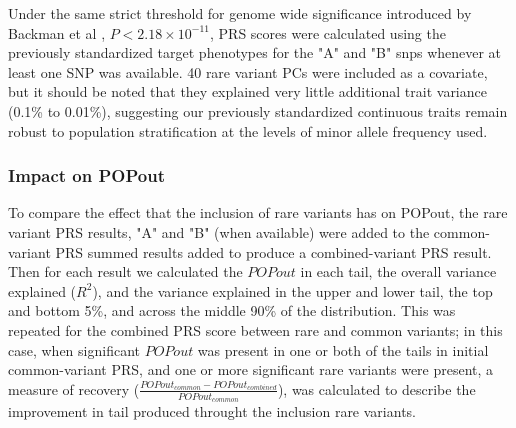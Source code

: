 \documentclass[12pt]{zHenriquesLab-StyleBioRxiv}
\begin{document}
{{{Under the same strict threshold for genome wide significance introduced
by Backman et al \cite{Backman2021}, $P<2.18 \times 10^{-11}$, PRS scores
were calculated using the previously standardized target phenotypes for
the "A" and "B" snps whenever at least one SNP was available.  40 rare variant PCs
were included as a covariate, but it should be noted that they explained very
little additional trait variance (0.1\% to 0.01\%), suggesting our previously
standardized continuous traits remain robust to population stratification
at the levels of minor allele frequency used.

\subsubsection*{Impact on POPout}

To compare the effect that the inclusion of rare variants has on POPout, the rare variant PRS results,
"A" and "B" (when available) were added to the common-variant PRS summed results added to produce a 
combined-variant PRS result.  Then for each result we calculated the $POPout$ 
in each tail, the overall variance explained ($R^2$), and the variance
explained in the upper and lower tail, the top and bottom 5\%, and across the middle 90\% of the
distribution.   This was repeated for the combined PRS score between rare and common variants;
in this case, when significant $POPout$ was present in one or both of the tails in initial
common-variant PRS, and one or more significant rare variants were present, 
a measure of recovery ($\frac{{POPout}_{common}-POPout_{combined}}{POPout_{common}}$),
was calculated to describe the improvement in tail produced throught the inclusion rare variants.


}}}
\end{document}
